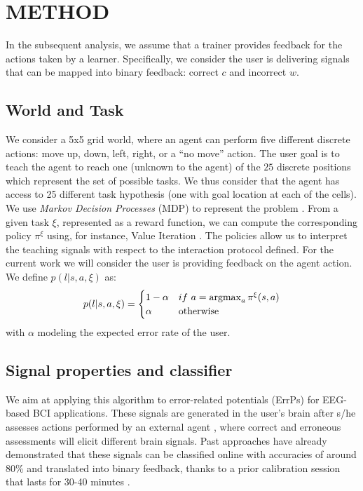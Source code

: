 \section{METHOD}
\label{sec:method}

In the subsequent analysis, we assume that a trainer provides feedback for the actions taken by a learner. Specifically, we consider the user is delivering signals that can be mapped into binary feedback: correct $c$ and incorrect $w$. 

\subsection{World and Task}
We consider a 5x5 grid world, where an agent can perform five different discrete actions: move up, down, left, right, or a ``no move'' action. The user goal is to teach the agent to reach one (unknown to the agent) of the $25$ discrete positions which represent the set of possible tasks. We thus consider that the agent has access to 25 different task hypothesis (one with goal location at each of the cells). We use \textit{Markov Decision Processes} (MDP) to represent the problem \cite{sutton1998reinforcement}. From a given task $\xi$, represented as a reward function, we can compute the corresponding policy $\pi^{\xi}$ using, for instance, Value Iteration \cite{sutton1998reinforcement}. The policies allow us to interpret the teaching signals with respect to the interaction protocol defined. For the current work we will consider the user is providing feedback on the agent action. We define $p(l | s, a, \xi)$ as:
%
\begin{equation*}
    p(l | s, a, \xi) = 
    \begin{cases}
	1-\alpha               & if~a = \argmax_a \pi^{\xi}(s,a)\\
        \alpha             & \text{otherwise}\\
   \end{cases}
\end{equation*}
with $\alpha$ modeling the expected error rate of the user. 

\subsection{Signal properties and classifier}

We aim at applying this algorithm to error-related potentials (ErrPs) for EEG-based BCI applications. These signals are generated in the user's brain after s/he assesses actions performed by an external agent \cite{chavarriaga2010learning}, where correct and erroneous assessments will elicit different brain signals. Past approaches have already demonstrated that these signals can be classified online with accuracies of around 80\% and translated into binary feedback, thanks to a prior calibration session that lasts for 30-40 minutes \cite{chavarriaga2010learning, iturrate2013task}.

